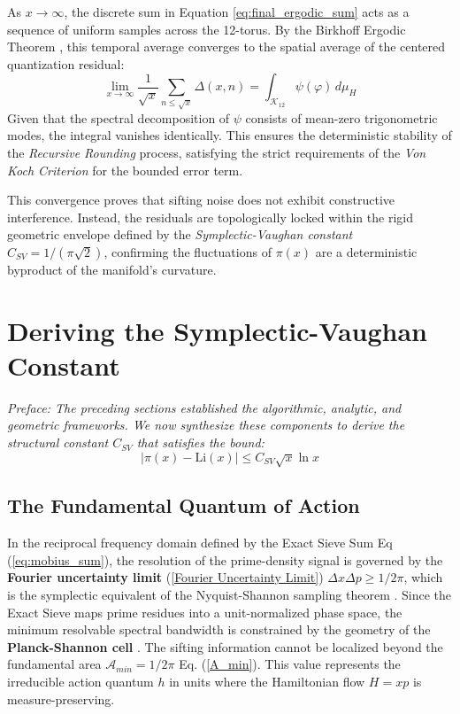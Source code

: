 \documentclass[sn-mathphys-num, pdflatex]{sn-jnl}
\begin{document}
As $x \to \infty$, the discrete sum in Equation \ref{eq:final_ergodic_sum} acts as a sequence of uniform samples across the 12-torus. By the Birkhoff Ergodic Theorem \cite{birkhoff1931proof}, this temporal average converges to the spatial average of the centered quantization residual:
\begin{equation}
\lim_{x \to \infty} \frac{1}{\sqrt{x}} \sum_{n \le \sqrt{x}} \Delta(x, n) = \int_{\mathcal{K}_{12}} \psi(\varphi) \, d\mu_H
\end{equation}
Given that the spectral decomposition of $\psi$ consists of mean-zero trigonometric modes, the integral vanishes identically. This ensures the deterministic stability of the \textit{Recursive Rounding} process, satisfying the strict requirements of the \textit{Von Koch Criterion} for the bounded error term.

This convergence proves that sifting noise does not exhibit constructive interference. Instead, the residuals are topologically locked within the rigid geometric envelope defined by the \textit{Symplectic-Vaughan constant} $C_{SV} = 1/(\pi\sqrt{2})$, confirming the fluctuations of $\pi(x)$ are a deterministic byproduct of the manifold's curvature.

\section{Deriving the Symplectic-Vaughan Constant}
\label{sec:constant}
\textit{Preface: The preceding sections established the algorithmic, analytic, and geometric frameworks. We now synthesize these components to derive the structural constant $C_{SV}$ that satisfies the bound:}
\begin{equation}
|\pi(x) - \text{Li}(x)| \le C_{SV} \sqrt{x} \ln x
\end{equation}

\subsection{The Fundamental Quantum of Action}
\label{sec:action_quantum}

In the reciprocal frequency domain defined by the Exact Sieve Sum Eq (\ref{eq:mobius_sum}), the resolution of the prime-density signal is governed by the \textbf{Fourier   uncertainty limit} (\ref{Fourier Uncertainty Limit}) $\Delta x \Delta p \ge 1/2\pi$, which  is the symplectic equivalent of the Nyquist-Shannon sampling theorem \cite{shannon1949communication}.  Since the Exact Sieve maps prime residues into a unit-normalized phase space, the minimum resolvable spectral bandwidth is constrained by the geometry of the \textbf{ Planck-Shannon cell} \cite{gabor1946theory}. The sifting information cannot be localized beyond the fundamental area $\mathcal{A}_{min}=1/2\pi$ Eq. (\ref{A_min}). This value represents the irreducible action quantum $h$ in units where the Hamiltonian flow $H=xp$ is measure-preserving.
\end{document}
